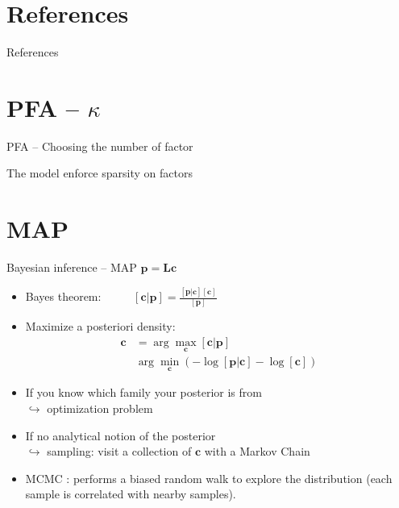 \documentclass[10pt,xcolor=x11names,compress, notes=show]{beamer}%
\begin{document}
\section*{References}

\begin{frame}{References}
		\setlength{\bibsep}{2em}
		
		
\end{frame}

\section*{PFA -- $\kappa$}
\begin{frame}{PFA -- Choosing the number of factor}
	\centering
	
	The model enforce sparsity on factors\\
	
	

\end{frame}

\section{MAP}
\begin{frame}{Bayesian inference -- MAP}
	\vspace{-0.2cm}
	\centering $\bm{p} = \bm{Lc}$
	\vfill
	\begin{itemize}
        		\item Bayes theorem:~~~~~ $[\bm{c}|\bm{p}] = \frac{[\bm{p}|\bm{c}][\bm{c}]}{[\bm{p}]}$
        		\vfill
        		\item Maximize a posteriori density: 
        		\begin{align*}
			\bm{c} &= \arg\max_{\bm{c}}[\bm{c}|\bm{p}]\\
			& \arg\min_{\bm{c}}(-\log[\bm{p}|\bm{c}]-\log[\bm{c}])
		\end{align*}
		\item If you know which family your posterior is from\\ $\hookrightarrow$ optimization problem
		\vfill
		\item If no analytical notion of the posterior\\ $\hookrightarrow$ sampling: visit a collection of $\bm{c}$ with a Markov Chain
		\vfill
		\item MCMC : performs a biased random walk to explore the distribution (each sample is correlated with nearby samples).
	\end{itemize}

\end{frame}
\end{document}

